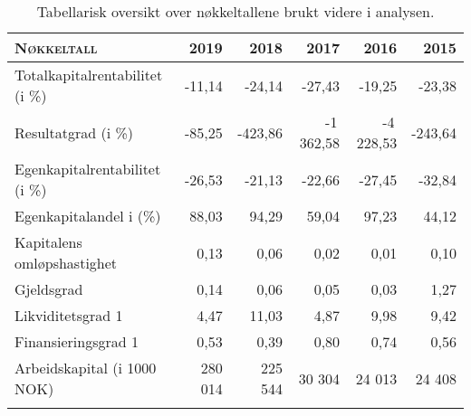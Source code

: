 
\begin{table}[H]
  \centering
  \caption[Oversikt over verdien på nøkkeltall]{Tabellarisk oversikt over nøkkeltallene brukt videre i analysen.}
  \renewcommand{\arraystretch}{1.2}
    \begin{tabular}{lrrrrr}
    \toprule
    \textsc{Nøkkeltall} & \textsc{2019}  & \textsc{2018}  & \textsc{2017}  & \textsc{2016}  & \textsc{2015} \\
    \midrule
    
    Totalkapitalrentabilitet (i \%) & -11,14 & -24,14 & -27,43 & -19,25 & -23,38 \\
    Resultatgrad (i \%) & -85,25 & -423,86  & -1\,362,58  & -4\,228,53  & -243,64  \\
    Egenkapitalrentabilitet (i \%) & -26,53  & -21,13  & -22,66  & -27,45  & -32,84  \\
    Egenkapitalandel i (\%) & 88,03 & 94,29 & 59,04 & 97,23 & 44,12\\
    
    Kapitalens omløpshastighet & 0,13 & 0,06 & 0,02 & 0,01 & 0,10 \\    
    Gjeldsgrad & 0,14 & 0,06 & 0,05 & 0,03 & 1,27 \\
    Likviditetsgrad 1 & 4,47 & 11,03 & 4,87 & 9,98 & 9,42 \\
    Finansieringsgrad 1 & 0,53 & 0,39 & 0,80 & 0,74 & 0,56 \\
    Arbeidskapital (i 1000 NOK) & 280 014 & 225 544 & 30 304 & 24 013 & 24 408 \\
    \bottomrule
    \addlinespace
    \end{tabular}
  \label{tab:nokkeltall}
\end{table}

